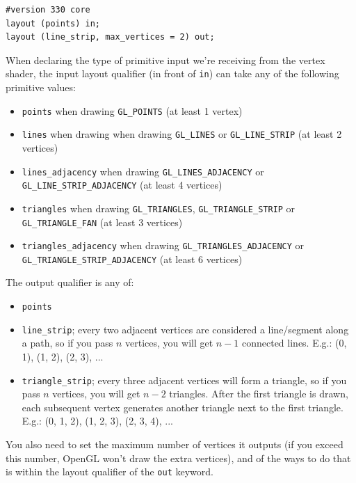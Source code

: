\documentclass[table, xcdraw]{article}%
\begin{document}
\begin{enumerate}
    \begin{verbatim}
#version 330 core
layout (points) in;
layout (line_strip, max_vertices = 2) out;
    \end{verbatim}

    When declaring the type of primitive input we're receiving from the vertex shader, the input layout qualifier (in front of \texttt{in}) can take any of the following primitive values:

    \begin{itemize}
        \item \texttt{points} when drawing \texttt{GL_POINTS} (at least 1 vertex)
        \item \texttt{lines} when drawing when drawing \texttt{GL_LINES} or \texttt{GL_LINE_STRIP} (at least 2 vertices)
        \item \texttt{lines_adjacency} when drawing \texttt{GL_LINES_ADJACENCY} or \texttt{GL_LINE_STRIP_ADJACENCY} (at least 4 vertices)
        \item \texttt{triangles} when drawing \texttt{GL_TRIANGLES}, \texttt{GL_TRIANGLE_STRIP} or \texttt{GL_TRIANGLE_FAN} (at least 3 vertices)
        \item \texttt{triangles_adjacency} when drawing \texttt{GL_TRIANGLES_ADJACENCY} or \texttt{GL_TRIANGLE_STRIP_ADJACENCY} (at least 6 vertices)
    \end{itemize}

    The output qualifier is any of:
    
    \begin{itemize}
        \item \texttt{points}
        \item \texttt{line_strip}; every two adjacent vertices are considered a line/segment along a path, so if you pass $n$ vertices, you will get $n-1$ connected lines. E.g.: (0, 1), (1, 2), (2, 3), ...
        \item \texttt{triangle_strip}; every three adjacent vertices will form a triangle, so if you pass $n$ vertices, you will get $n-2$ triangles. After the first triangle is drawn, each subsequent vertex generates another triangle next to the first triangle. E.g.: (0, 1, 2), (1, 2, 3), (2, 3, 4), ...
    \end{itemize}

    You also need to set the maximum number of vertices it outputs (if you exceed this number, OpenGL won't draw the extra vertices), and of the ways to do that is within the layout qualifier of the \texttt{out} keyword.


\end{enumerate}
\end{document}
